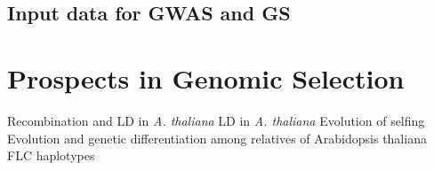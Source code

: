 \subsection{Input data for GWAS and GS}

\section{Prospects in Genomic Selection}





Recombination and LD in \textit{A. thaliana} \cite{kim2007recombination}
LD in \textit{A. thaliana} \cite{nordborg2002extent}
Evolution of selfing \cite{tang2007evolution}
Evolution and genetic differentiation among relatives of Arabidopsis thaliana \cite{koch2007evolution}
FLC haplotypes 







